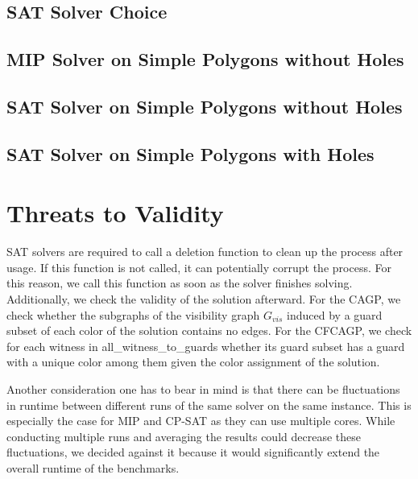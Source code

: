 \subsection{SAT Solver Choice}

\subsection{MIP Solver on Simple Polygons without Holes}

\subsection{SAT Solver on Simple Polygons without Holes}

\subsection{SAT Solver on Simple Polygons with Holes}

\section{Threats to Validity}
SAT solvers are required to call a deletion function to clean up the process after usage. If this function is not called, it can potentially corrupt the process. For this reason, we call this function as soon as the solver finishes solving. Additionally, we check the validity of the solution afterward. For the CAGP, we check whether the subgraphs of the visibility graph $G_{vis}$ induced by a guard subset of each color of the solution contains no edges. For the CFCAGP, we check for each witness in all\_witness\_to\_guards whether its guard subset has a guard with a unique color among them given the color assignment of the solution.

Another consideration one has to bear in mind is that there can be fluctuations in runtime between different runs of the same solver on the same instance. This is especially the case for MIP and CP-SAT as they can use multiple cores. While conducting multiple runs and averaging the results could decrease these fluctuations, we decided against it because it would significantly extend the overall runtime of the benchmarks.
